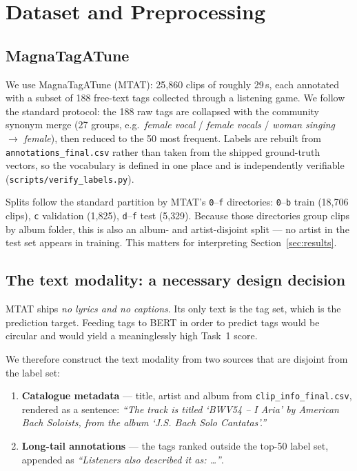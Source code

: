 \documentclass{article}
\begin{document}
\section{Dataset and Preprocessing}
\label{sec:data}

\subsection{MagnaTagATune}

We use MagnaTagATune (MTAT): 25{,}860 clips of roughly 29\,s, each annotated with
a subset of 188 free-text tags collected through a listening game. We follow the
standard protocol: the 188 raw tags are collapsed with the community synonym
merge (27 groups, e.g.\ \textit{female vocal} / \textit{female vocals} /
\textit{woman singing} $\rightarrow$ \textit{female}), then reduced to the 50 most
frequent. Labels are rebuilt from \texttt{annotations\_final.csv} rather than
taken from the shipped ground-truth vectors, so the vocabulary is defined in one
place and is independently verifiable
(\texttt{scripts/verify\_labels.py}).

Splits follow the standard partition by MTAT's \texttt{0}--\texttt{f}
directories: \texttt{0}--\texttt{b} train (18{,}706 clips), \texttt{c}
validation (1{,}825), \texttt{d}--\texttt{f} test (5{,}329). Because those
directories group clips by album folder, this is also an album- and
artist-disjoint split --- no artist in the test set appears in training. This
matters for interpreting Section~\ref{sec:results}.

\subsection{The text modality: a necessary design decision}
\label{sec:text-modality}

MTAT ships \emph{no lyrics and no captions}. Its only text is the tag set, which
is the prediction target. Feeding tags to BERT in order to predict tags would be
circular and would yield a meaninglessly high Task~1 score.

We therefore construct the text modality from two sources that are disjoint from
the label set:

\begin{enumerate}
  \item \textbf{Catalogue metadata} --- title, artist and album from
        \texttt{clip\_info\_final.csv}, rendered as a sentence: \textit{``The
        track is titled `BWV54 -- I Aria' by American Bach Soloists, from the
        album `J.S. Bach Solo Cantatas'.''}
  \item \textbf{Long-tail annotations} --- the tags ranked outside the top-50
        label set, appended as \textit{``Listeners also described it as:
        \dots''}.
\end{enumerate}
\end{document}
